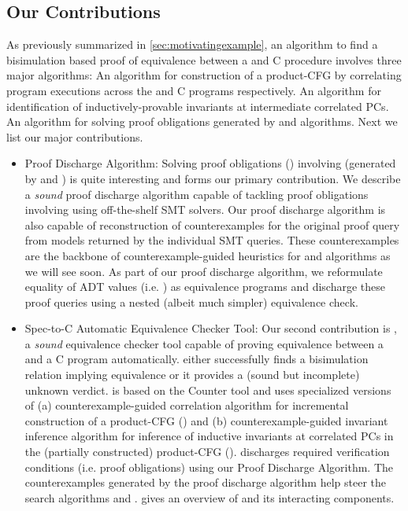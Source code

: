 \subsection{Our Contributions}
\label{sec:contribs}
As previously summarized in \cref{sec:motivatingexample}, an algorithm to find a bisimulation based proof of equivalence
between a \SpecL{} and C procedure involves three major algorithms:
 An algorithm for construction of a product-CFG by correlating program executions
across the \SpecL{} and C programs respectively.
 An algorithm for identification of inductively-provable invariants at intermediate correlated PCs.
 An algorithm for solving proof obligations generated by  and  algorithms.
Next we list our major contributions.

\begin{itemize}
\item Proof Discharge Algorithm: Solving proof obligations () involving \recursiveRelations{}
(generated by  and ) is quite interesting and forms our primary contribution.
We describe a {\em sound} proof discharge algorithm capable of tackling proof obligations involving
\recursiveRelations{} using off-the-shelf SMT solvers. Our proof discharge algorithm is also capable of
reconstruction of counterexamples for the original proof query from models returned by the individual SMT queries.
These counterexamples are the backbone of counterexample-guided heuristics for  and  algorithms
as we will see soon.
As part of our proof discharge algorithm,
we reformulate equality of ADT values (i.e. \recursiveRelations{}) as equivalence programs
and discharge these proof queries using a nested (albeit much simpler) equivalence check.

\item Spec-to-C Automatic Equivalence Checker Tool: Our second contribution is \toolName{}, a {\em sound} equivalence checker tool
capable of proving equivalence between a \SpecL{} and a C program automatically.
\toolName{} either successfully finds a bisimulation relation implying equivalence or it provides a (sound but incomplete) unknown verdict.
\toolName{} is based on the Counter tool\cite{oopsla20} and uses specialized versions of (a) counterexample-guided correlation algorithm for
incremental construction of a product-CFG () and (b) counterexample-guided invariant inference algorithm
for inference of inductive invariants at correlated PCs in the (partially constructed) product-CFG ().
\toolName{} discharges required verification conditions (i.e. proof obligations) using our Proof Discharge Algorithm.
The counterexamples generated by the proof discharge algorithm help steer the search algorithms  and .
 gives an overview of \toolName{} and its interacting components.
\end{itemize}

